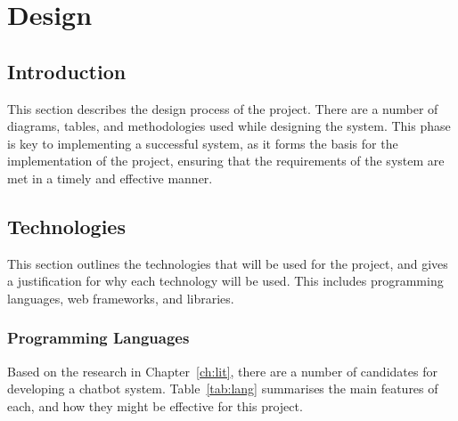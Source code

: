 \chapter{Design}
\label{ch:design}
\section{Introduction}
This section describes the design process of the project. There are a number of diagrams, tables, and methodologies used while designing the system. This phase is key to implementing a successful system, as it forms the basis for the implementation of the project, ensuring that the requirements of the system are met in a timely and effective manner.

\section{Technologies}
This section outlines the technologies that will be used for the project, and gives a justification for why each technology will be used. This includes programming languages, web frameworks, and libraries.

\subsection{Programming Languages}
\label{sec:lang}
Based on the research in Chapter~\ref{ch:lit}, there are a number of candidates for developing a chatbot system. Table~\ref{tab:lang} summarises the main features of each, and how they might be effective for this project.

